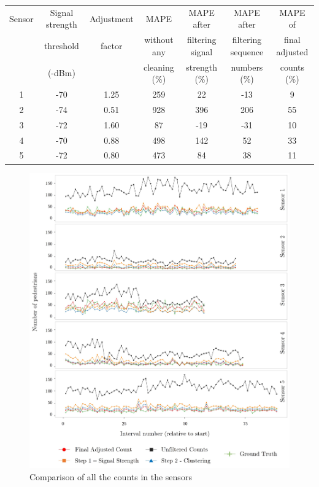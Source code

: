 \begin{table}
	{\begin{tabular}{ccccccc} 
		\toprule
			Sensor & Signal strength & Adjustment & MAPE & MAPE after & MAPE after & MAPE of\\
			& threshold & factor & without any & filtering signal & filtering sequence & final adjusted\\
			& (-dBm) & &  cleaning (\%) & strength (\%) & numbers (\%) & counts (\%)\\
		 \midrule
			1 & -70 & 1.25 & 259 &  22 & -13 &  9 \\
			2 & -74 & 0.51 & 928 & 396 & 206 & 55 \\
			3 & -72 & 1.60 &  87 & -19 & -31 & 10 \\
			4 & -70 & 0.88 & 498 & 142 &  52 & 33 \\
			5 & -72 & 0.80 & 473 &  84 &  38 & 11 \\
		 \bottomrule
	\end{tabular}}
	\label{errors-table}
\end{table}

\begin{figure}
	\begin{center}
		\includegraphics [width=\linewidth,trim=6 6 6 6,clip] {images/main_comparison.jpeg}
		\caption{Comparison of all the counts in the sensors}
		\label{main_comparison}
	\end{center}
\end{figure}

